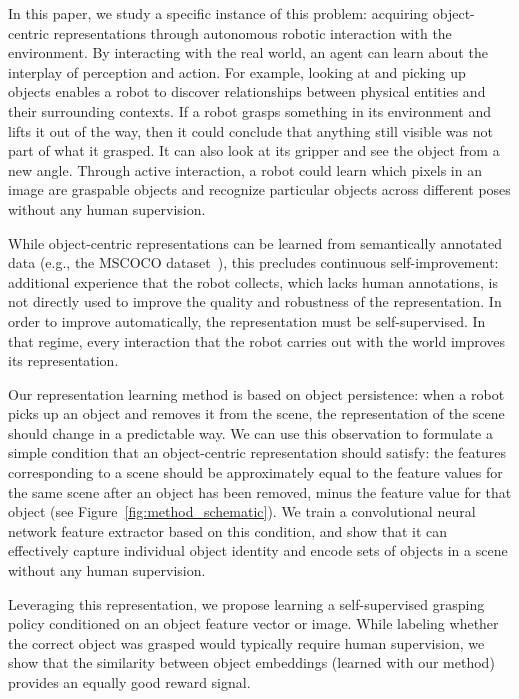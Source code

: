 \documentclass{article}
\begin{document}
In this paper, we study a specific instance of this problem: acquiring object-centric representations through autonomous robotic interaction with the environment. By interacting with the real world, an agent can learn about the interplay of perception and action.
For example, looking at and picking up objects enables a robot to discover relationships between physical entities and their surrounding contexts. If a robot grasps something in its environment and lifts it out of the way, then it could conclude that anything still visible was not part of what it grasped. It can also look at its gripper and see the object from a new angle. Through active interaction, a robot could learn which pixels in an image are graspable objects and recognize particular objects across different poses without any human supervision.

While object-centric representations can be learned from semantically annotated data (e.g., the MSCOCO dataset~\cite{lin2014microsoft}), this precludes continuous self-improvement: additional experience that the robot collects, which lacks human annotations, is not directly used to improve the quality and robustness of the representation. In order to improve automatically, the representation must be self-supervised. In that regime, every interaction that the robot carries out with the world improves its representation.

Our representation learning method is based on object persistence: when a robot picks up an object and removes it from the scene, the representation of the scene should change in a predictable way. We can use this observation to formulate a simple condition that an object-centric representation should satisfy: the features corresponding to a scene should be approximately equal to the feature values for the same scene after an object has been removed, minus the feature value for that object (see Figure~\ref{fig:method_schematic}). We train a convolutional neural network feature extractor based on this condition, and show that it can effectively capture individual object identity and encode sets of objects in a scene without any human supervision.

Leveraging this representation, we propose learning a self-supervised grasping policy conditioned on an object feature vector or image.
While labeling whether the correct object was grasped would typically require human supervision, we show that the
similarity between object embeddings (learned with our method) provides an equally good reward signal.
\end{document}
